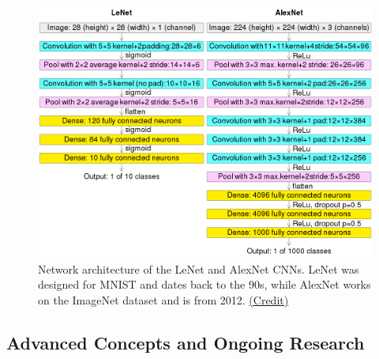 \documentclass{article}
\begin{document}
\begin{figure}[h!]
    \centering
    \includegraphics[width=0.7\linewidth]{lenet_alexnet}
    \caption{Network architecture of the LeNet and AlexNet CNNs. LeNet was designed for MNIST and dates back to the 90s, while AlexNet works on the ImageNet dataset and is from 2012. \href{https://commons.wikimedia.org/wiki/File:Comparison\_image\_neural\_networks.svg}{(Credit)}}
    \label{fig:lenet_alexnet}
\end{figure}

\subsection{Advanced Concepts and Ongoing Research}
\end{document}
